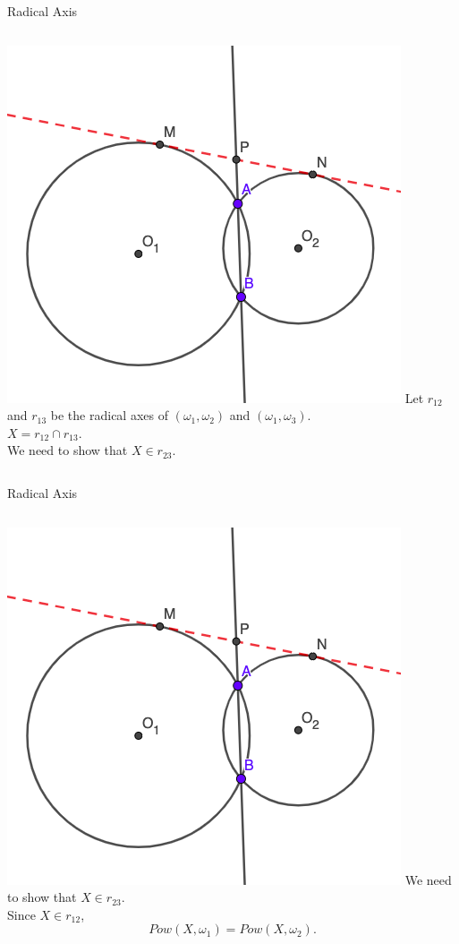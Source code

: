 \documentclass{beamer}
\begin{document}
\begin{frame}{Radical Axis}
	\begin{columns}
		\includegraphics[scale=0.4]{rad3.png}
		Let $r_{12}$ and $r_{13}$ be the radical axes of 
		$(\omega_1, \omega_2)$ and $(\omega_1, \omega_3)$.\\
		$X = r_{12}\cap r_{13}$.\\
		\phantom{Spacing}
		We need to show that $X\in r_{23}$.
	\end{columns}
\end{frame}
\begin{frame}{Radical Axis}
	\begin{columns}
		\column{0.6\textwidth}
		\includegraphics[scale=0.4]{rad3.png}
		\column{0.4\textwidth}
		We need to show that $X\in r_{23}$.\\
		\phantom{Spacing}
		Since $X\in r_{12}$,
		\[
			Pow(X, \omega_1) = Pow(X,\omega_2)
		.\] 
	\end{columns}
\end{frame}
\end{document}
